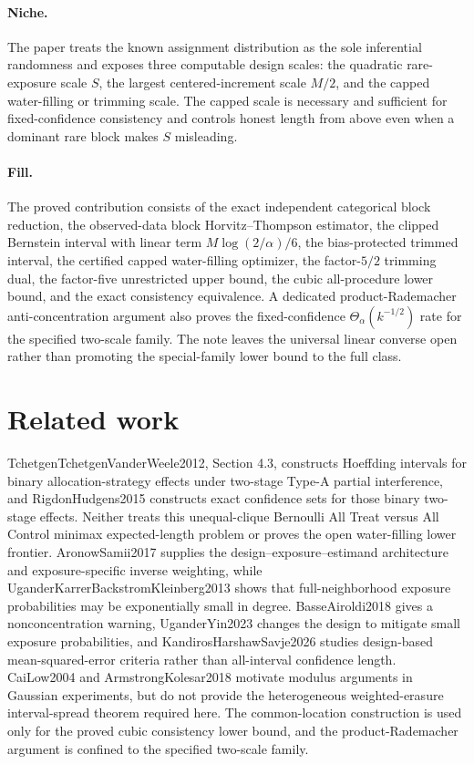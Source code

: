 \documentclass{article}
\begin{document}
\paragraph{Niche.} The paper treats the known assignment distribution as the sole inferential randomness and exposes three computable design scales: the quadratic rare-exposure scale \(S\), the largest centered-increment scale \(M/2\), and the capped water-filling or trimming scale. The capped scale is necessary and sufficient for fixed-confidence consistency and controls honest length from above even when a dominant rare block makes \(S\) misleading.

\paragraph{Fill.} The proved contribution consists of the exact independent categorical block reduction, the observed-data block Horvitz--Thompson estimator, the clipped Bernstein interval with linear term \(M\log(2/\alpha)/6\), the bias-protected trimmed interval, the certified capped water-filling optimizer, the factor-\(5/2\) trimming dual, the factor-five unrestricted upper bound, the cubic all-procedure lower bound, and the exact consistency equivalence. A dedicated product-Rademacher anti-concentration argument also proves the fixed-confidence \(\Theta_\alpha(k^{-1/2})\) rate for the specified two-scale family. The note leaves the universal linear converse open rather than promoting the special-family lower bound to the full class.

\section{Related work}

TchetgenTchetgenVanderWeele2012, Section 4.3, constructs Hoeffding intervals for binary allocation-strategy effects under two-stage Type-A partial interference, and RigdonHudgens2015 constructs exact confidence sets for those binary two-stage effects. Neither treats this unequal-clique Bernoulli All Treat versus All Control minimax expected-length problem or proves the open water-filling lower frontier. AronowSamii2017 supplies the design--exposure--estimand architecture and exposure-specific inverse weighting, while UganderKarrerBackstromKleinberg2013 shows that full-neighborhood exposure probabilities may be exponentially small in degree. BasseAiroldi2018 gives a nonconcentration warning, UganderYin2023 changes the design to mitigate small exposure probabilities, and KandirosHarshawSavje2026 studies design-based mean-squared-error criteria rather than all-interval confidence length. CaiLow2004 and ArmstrongKolesar2018 motivate modulus arguments in Gaussian experiments, but do not provide the heterogeneous weighted-erasure interval-spread theorem required here. The common-location construction is used only for the proved cubic consistency lower bound, and the product-Rademacher argument is confined to the specified two-scale family.
\end{document}
